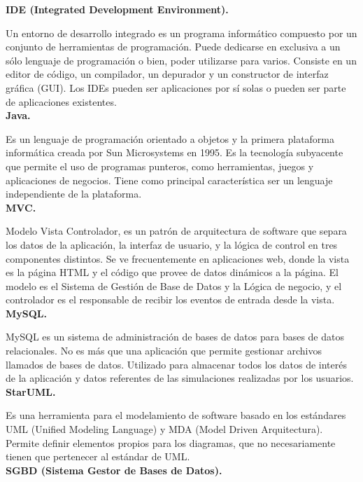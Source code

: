 \documentclass[../pfc.tex]{subfiles}
\begin{document}
	\textbf{IDE (Integrated Development Environment).}
	
	Un entorno de desarrollo integrado es un programa
	informático compuesto por un conjunto de herramientas de programación. Puede dedicarse en
	exclusiva a un sólo lenguaje de programación o bien, poder utilizarse para varios. Consiste en un
	editor de código, un compilador, un depurador y un constructor de interfaz gráfica (GUI). Los IDEs
	pueden ser aplicaciones por sí solas o pueden ser parte de aplicaciones existentes.\\
	
	\textbf{Java.}
	
	Es un lenguaje de programación orientado a objetos y la primera plataforma informática
	creada por Sun Microsystems en 1995. Es la tecnología subyacente que permite el uso de
	programas punteros, como herramientas, juegos y aplicaciones de negocios. Tiene como principal
	característica ser un lenguaje independiente de la plataforma.\\
	
	\textbf{MVC.}
	
	Modelo Vista Controlador, es un patrón de arquitectura de software que separa los datos de
	la aplicación, la interfaz de usuario, y la lógica de control en tres componentes distintos. Se ve
	frecuentemente en aplicaciones web, donde la vista es la página HTML y el código que provee de
	datos dinámicos a la página. El modelo es el Sistema de Gestión de Base de Datos y la Lógica de
	negocio, y el controlador es el responsable de recibir los eventos de entrada desde la vista.\\
	
	\textbf{MySQL.}
	
	MySQL es un sistema de administración de bases de datos para bases de datos
	relacionales. No es más que una aplicación que permite gestionar archivos llamados de bases de
	datos. Utilizado para almacenar todos los datos de interés de la aplicación y datos referentes de las
	simulaciones realizadas por los usuarios.\\
	
	\textbf{StarUML.}
	
	Es una herramienta para el modelamiento de software basado en los estándares UML
	(Unified Modeling Language) y MDA (Model Driven Arquitectura). Permite definir elementos
	propios para los diagramas, que no necesariamente tienen que pertenecer al estándar de UML.\\
	
	\textbf{SGBD (Sistema Gestor de Bases de Datos).}
	
\end{document}

